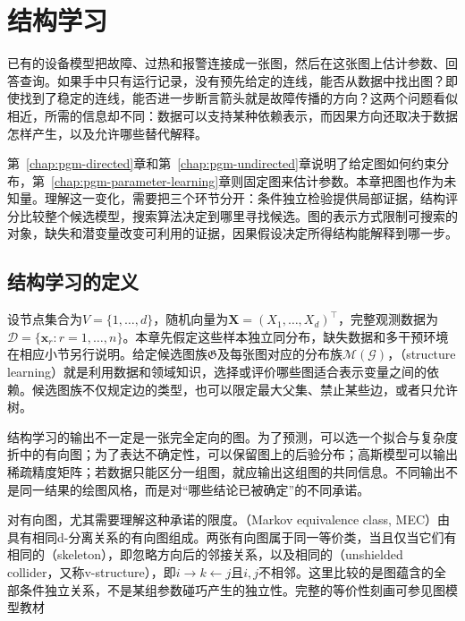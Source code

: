 \chapter{结构学习}
\label{chap:pgm-structure-learning}

已有的设备模型把故障、过热和报警连接成一张图，然后在这张图上估计参数、回答查询。如果手中只有运行记录，没有预先给定的连线，能否从数据中找出图？即使找到了稳定的连线，能否进一步断言箭头就是故障传播的方向？这两个问题看似相近，所需的信息却不同：数据可以支持某种依赖表示，而因果方向还取决于数据怎样产生，以及允许哪些替代解释。

第~\ref{chap:pgm-directed}章和第~\ref{chap:pgm-undirected}章说明了给定图如何约束分布，第~\ref{chap:pgm-parameter-learning}章则固定图来估计参数。本章把图也作为未知量。理解这一变化，需要把三个环节分开：条件独立检验提供局部证据，结构评分比较整个候选模型，搜索算法决定到哪里寻找候选。图的表示方式限制可搜索的对象，缺失和潜变量改变可利用的证据，因果假设决定所得结构能解释到哪一步。

\section{结构学习的定义}
\label{sec:pgm-structure-learning-definition}

设节点集合为$V=\{1,\ldots,d\}$，随机向量为$\bm{X}=(X_1,\ldots,X_d)^{\top}$，完整观测数据为$\mathcal{D}=\{\bm{x}_r:r=1,\ldots,n\}$。本章先假定这些样本独立同分布，缺失数据和多干预环境在相应小节另行说明。给定候选图族$\mathfrak{G}$及每张图对应的分布族$\mathcal{M}(\mathcal{G})$，（structure learning）就是利用数据和领域知识，选择或评价哪些图适合表示变量之间的依赖。候选图族不仅规定边的类型，也可以限定最大父集、禁止某些边，或者只允许树。

结构学习的输出不一定是一张完全定向的图。为了预测，可以选一个拟合与复杂度折中的有向图；为了表达不确定性，可以保留图上的后验分布；高斯模型可以输出稀疏精度矩阵；若数据只能区分一组图，就应输出这组图的共同信息。不同输出不是同一结果的绘图风格，而是对“哪些结论已被确定”的不同承诺。

对有向图，尤其需要理解这种承诺的限度。（Markov equivalence class, MEC）由具有相同d-分离关系的有向图组成。两张有向图属于同一等价类，当且仅当它们有相同的（skeleton），即忽略方向后的邻接关系，以及相同的（unshielded collider，又称v-structure），即$i\to k\leftarrow j$且$i,j$不相邻。这里比较的是图蕴含的全部条件独立关系，不是某组参数碰巧产生的独立性。完整的等价性刻画可参见图模型教材

